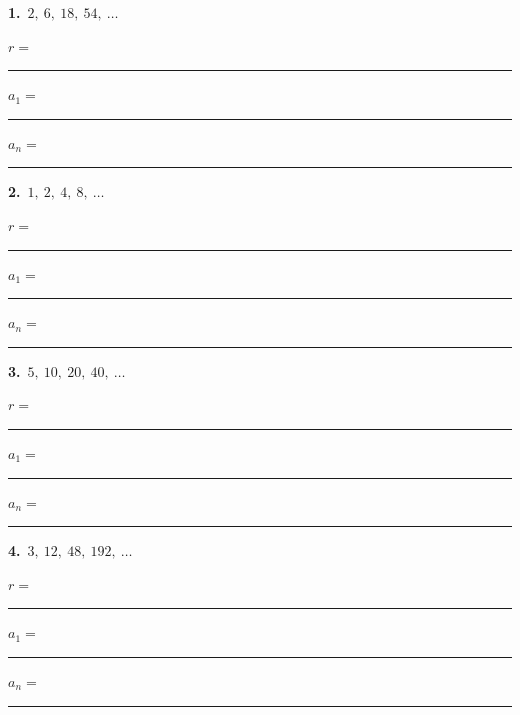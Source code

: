 \documentclass[11pt,letterpaper]{article}
\begin{document}
\needspace{2.3cm}\par\vspace{3mm}\noindent\begin{minipage}[t]{0.48\linewidth}{\color{fmturn}\bfseries 1.}\ $2,\ 6,\ 18,\ 54,\ \ldots$\par\vspace{2mm}\hspace*{4mm}$r=$\,\rule{1.2cm}{0.4pt}\par\vspace{2.5mm}\hspace*{4mm}$a_1=$\,\rule{1.4cm}{0.4pt}\quad $a_n=$\,\rule{2.6cm}{0.4pt}\end{minipage}\hfill\begin{minipage}[t]{0.48\linewidth}{\color{fmturn}\bfseries 2.}\ $1,\ 2,\ 4,\ 8,\ \ldots$\par\vspace{2mm}\hspace*{4mm}$r=$\,\rule{1.2cm}{0.4pt}\par\vspace{2.5mm}\hspace*{4mm}$a_1=$\,\rule{1.4cm}{0.4pt}\quad $a_n=$\,\rule{2.6cm}{0.4pt}\end{minipage}\par\vspace{1.3cm}
\needspace{2.3cm}\par\vspace{3mm}\noindent\begin{minipage}[t]{0.48\linewidth}{\color{fmturn}\bfseries 3.}\ $5,\ 10,\ 20,\ 40,\ \ldots$\par\vspace{2mm}\hspace*{4mm}$r=$\,\rule{1.2cm}{0.4pt}\par\vspace{2.5mm}\hspace*{4mm}$a_1=$\,\rule{1.4cm}{0.4pt}\quad $a_n=$\,\rule{2.6cm}{0.4pt}\end{minipage}\hfill\begin{minipage}[t]{0.48\linewidth}{\color{fmturn}\bfseries 4.}\ $3,\ 12,\ 48,\ 192,\ \ldots$\par\vspace{2mm}\hspace*{4mm}$r=$\,\rule{1.2cm}{0.4pt}\par\vspace{2.5mm}\hspace*{4mm}$a_1=$\,\rule{1.4cm}{0.4pt}\quad $a_n=$\,\rule{2.6cm}{0.4pt}\end{minipage}\par\vspace{1.3cm}
\end{document}
